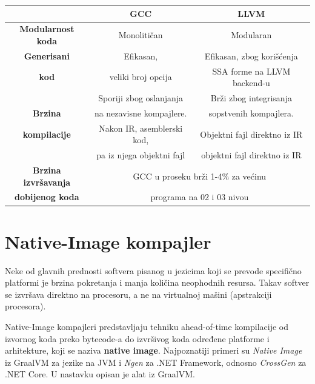 \documentclass[a4paper]{article}
\begin{document}
\vspace{2em}
\hspace{-5em}
\begin{tabular}{|c|c|c|}
  \toprule
   & \textbf{GCC} & \textbf{LLVM} \\
  \midrule
  \textbf{Modularnost koda} & Monolitičan & Modularan \\
  \midrule
  \textbf{Generisani} & Efikasan, & Efikasan, zbog korišćenja \\
  \textbf{kod} & veliki broj opcija &  SSA forme na LLVM backend-u \\
  \midrule
  {} & Sporiji zbog oslanjanja  & Brži zbog integrisanja  \\  
  \textbf{Brzina} & na nezavisne kompajlere.  & sopstvenih kompajlera. \\  
  \textbf{kompilacije} & Nakon IR, asemblerski kod, & Objektni fajl direktno iz IR \\  
  {} & pa iz njega objektni fajl & objektni fajl direktno iz IR \\  
  \midrule
  \textbf{Brzina izvršavanja} &   \multicolumn{2}{|c|}{GCC u proseku brži 1-4\%  za većinu} \\
  \textbf{dobijenog koda}     &   \multicolumn{2}{|c|}{programa na 02 i 03 nivou}  \\  
  \bottomrule
  \end{tabular}

  \vspace{2em}
  

\section{Native-Image kompajler}
\label{sec:natImg}

Neke od glavnih prednosti softvera pisanog u jezicima koji se prevode specifično platformi je
brzina pokretanja i manja količina neophodnih resursa. Takav softver se izvršava direktno na
procesoru, a ne na virtualnoj mašini (apstrakciji procesora).

Native-Image kompajleri predstavljaju tehniku ahead-of-time kompilacije od izvornog koda preko
bytecode-a do izvršivog koda određene platforme i arhitekture, koji se 
naziva \textbf{native image}. \cite{natImgGraal01}
Najpoznatiji primeri su \textit{Native Image} iz GraalVM za jezike na JVM i
\textit{Ngen} za .NET Framework, odnosno \textit{CrossGen} za .NET Core.
U nastavku opisan je alat iz GraalVM.
\end{document}

